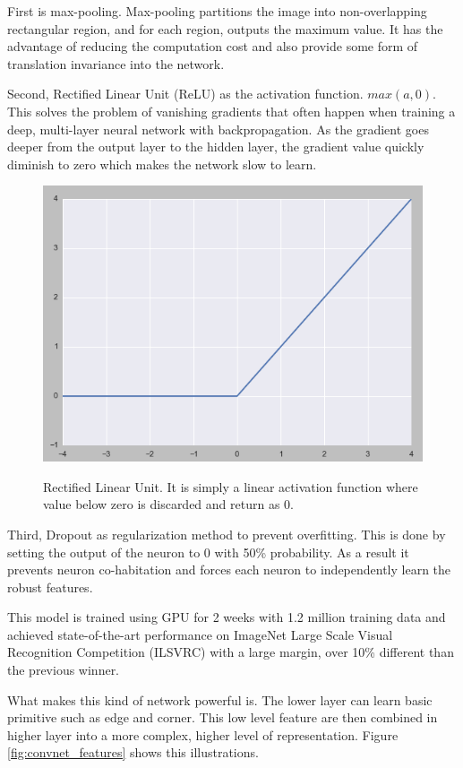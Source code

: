 \documentclass[a4paper,11pt]{kth-mag}
\begin{document}
First is max-pooling. Max-pooling partitions the image into non-overlapping rectangular region, and for each region, outputs the maximum value. It has the advantage of reducing the computation cost and also provide some form of translation invariance into the network.

Second, Rectified Linear Unit (ReLU) as the activation function. $max(a, 0)$. This solves the problem of vanishing gradients that often happen when training a deep, multi-layer neural network with backpropagation. As the gradient goes deeper from the output layer to the hidden layer, the gradient value quickly diminish to zero which makes the network slow to learn.

\begin{figure}[h]
\centering
\includegraphics[scale=0.5]{image/relu.png}
\label{fig:relu}
\caption{Rectified Linear Unit. It is simply a linear activation function where value below zero is discarded and return as 0.}
\end{figure}

Third, Dropout as regularization method to prevent overfitting. This is done by setting the output of the neuron to 0 with 50\% probability. As a result it prevents neuron co-habitation and forces each neuron to independently learn the robust features.

This model is trained using GPU for 2 weeks with 1.2 million training data and achieved state-of-the-art performance on ImageNet Large Scale Visual Recognition Competition (ILSVRC) \cite{alexnet} with a large margin, over 10\% different than the previous winner.

What makes this kind of network powerful is. The lower layer can learn basic primitive such as edge and corner. This low level feature are then combined in higher layer into a more complex, higher level of representation. Figure \ref{fig:convnet_features} shows this illustrations.
\end{document}
